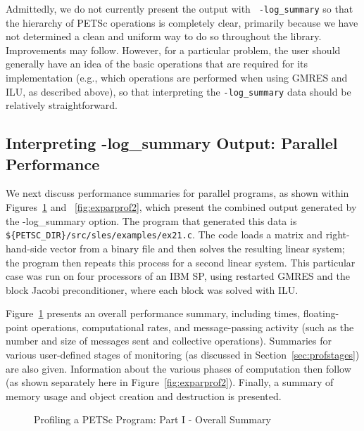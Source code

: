 {Admittedly, we do not currently present the output with {\tt
-log\_summary} so that the hierarchy of PETSc operations is completely
clear, primarily because we have not determined a clean and uniform
way to do so throughout the library.  Improvements may follow.
However, for a particular problem, the user should generally have
an idea of the basic operations that are required for its
implementation (e.g., which operations are performed when using GMRES
and ILU, as described above), so that interpreting the {\tt -log\_summary}
data should be relatively straightforward.

\subsection{Interpreting -log\_summary Output: Parallel Performance}
\label{sec:parperformance}

We next discuss performance summaries for parallel programs,
 as shown within Figures~\ref{fig:exparprof} and
~\ref{fig:exparprof2}, which present the combined output generated by
the {-log\_summary} option.  The program that generated this data is
{\tt \$\{PETSC\_DIR\}/src/sles/examples/ex21.c}.  The code loads a
matrix and right-hand-side vector from a binary file and then solves
the resulting linear system; the program then repeats this process for
a second linear system.  This particular case was run on four
processors of an IBM SP, using restarted GMRES and the block Jacobi
preconditioner, where each block was solved with ILU.

Figure~\ref{fig:exparprof} presents an overall performance summary,
including times, floating-point operations, computational rates, and
message-passing activity (such as the number and size of messages sent
and collective operations).  Summaries for various user-defined stages
of monitoring (as discussed in Section~\ref{sec:profstages}) are also
given. Information about the various phases of computation then follow
(as shown separately here in Figure~\ref{fig:exparprof2}).
Finally, a summary of memory usage and object creation and destruction
is presented.

\begin{figure}[tb]
\centerline{}
\vspace{-2.5in}
\caption{Profiling a PETSc Program: Part I - Overall Summary}
\label{fig:exparprof}
\end{figure}

}
